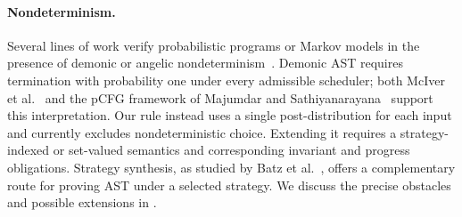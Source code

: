 \paragraph{Nondeterminism.}
Several lines of work verify probabilistic programs or Markov models in the presence of demonic or angelic nondeterminism~\cite{10.1145/3158121,DBLP:journals/pacmpl/BatzBKW24,Wang2018ADS,Zilberstein2025,10.1145/3743131,Zilberstein_2025}. Demonic AST requires termination with probability one under every admissible scheduler; both McIver et al.~\cite{10.1145/3158121} and the pCFG framework of Majumdar and Sathiyanarayana~\cite{DBLP:journals/pacmpl/MajumdarS25} support this interpretation. Our rule instead uses a single post-distribution for each input and currently excludes nondeterministic choice. Extending it requires a strategy-indexed or set-valued semantics and corresponding invariant and progress obligations. Strategy synthesis, as studied by Batz et al.~\cite{DBLP:journals/pacmpl/BatzBKW24}, offers a complementary route for proving AST under a selected strategy. We discuss the precise obstacles and possible extensions in .
